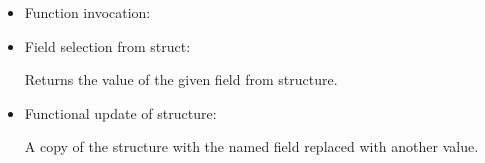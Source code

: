 \begin{itemize}
\item Function invocation:


\item Field selection from struct:


Returns the value of the given field from structure.

\item Functional update of structure:


A copy of the structure with the named field replaced with another value.

\end{itemize}

%
